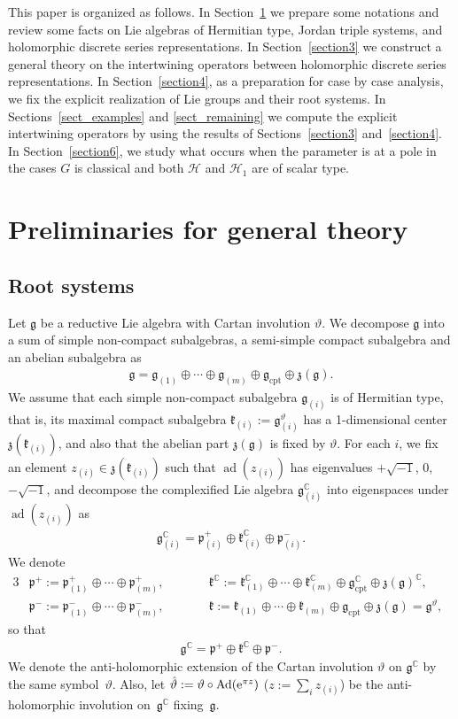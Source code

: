 \documentclass[pdftex]{sigma}
\numberwithin{equation}{section}
\newcommand{\BC}{\mathbb{C}}
\newcommand{\fg}{\mathfrak{g}}
\newcommand{\fk}{\mathfrak{k}}
\newcommand{\fp}{\mathfrak{p}}
\newcommand{\fz}{\mathfrak{z}}
\newcommand{\cH}{\mathcal{H}}
\begin{document}
This paper is organized as follows. In Section~\ref{section2} we prepare some notations and review some facts on Lie algebras of Hermitian type, Jordan triple systems, and holomorphic discrete series representations. In Section~\ref{section3} we construct a general theory on the intertwining operators between holomorphic discrete series representations. In Section~\ref{section4}, as a preparation for case by case analysis, we fix the explicit realization of Lie groups and their root systems. In Sections~\ref{sect_examples} and \ref{sect_remaining} we compute the explicit intertwining operators by using the results of Sections~\ref{section3} and~\ref{section4}. In Section~\ref{section6}, we study what occurs when the parameter is at a pole in the cases $G$ is classical and both $\cH$ and $\cH_1$ are of scalar type.

\section{Preliminaries for general theory}\label{section2}
\subsection{Root systems}\label{root_sys}
Let $\fg$ be a reductive Lie algebra with Cartan involution $\vartheta$. We decompose $\fg$ into a sum of simple non-compact subalgebras, a semi-simple compact subalgebra and an abelian subalgebra as
\begin{gather*} \fg=\fg_{(1)}\oplus\cdots\oplus\fg_{(m)}\oplus\fg_{\text{cpt}}\oplus\fz(\fg). \end{gather*}
We assume that each simple non-compact subalgebra $\fg_{(i)}$ is of Hermitian type, that is,
its maximal compact subalgebra $\fk_{(i)}:=\fg^\vartheta_{(i)}$ has a 1-dimensional center $\fz(\fk_{(i)})$, and also that the abelian part $\fz(\fg)$ is fixed by $\vartheta$. For each $i$, we fix an element $z_{(i)}\in\fz(\fk_{(i)})$ such that $\operatorname{ad}(z_{(i)})$ has eigenvalues $+\sqrt{-1}$, $0$, $-\sqrt{-1}$,
and decompose the complexified Lie algebra $\fg_{(i)}^\BC$ into eigenspaces under $\operatorname{ad}(z_{(i)})$ as
\begin{gather*} \fg_{(i)}^\BC=\fp^+_{(i)}\oplus \fk^\BC_{(i)}\oplus\fp^-_{(i)}. \end{gather*}
We denote
\begin{alignat*}{3}
& \fp^+ :=\fp^+_{(1)}\oplus\cdots\oplus\fp^+_{(m)},\qquad && \fk^\BC:=\fk_{(1)}^\BC\oplus\cdots\oplus\fk_{(m)}^\BC\oplus\fg_{\text{cpt}}^\BC\oplus\fz(\fg)^\BC,&\\
&\fp^-:=\fp^-_{(1)}\oplus\cdots\oplus\fp^-_{(m)},\qquad && \fk :=\fk_{(1)}\oplus\cdots\oplus\fk_{(m)}\oplus\fg_{\text{cpt}}\oplus\fz(\fg)=\fg^\vartheta,&
\end{alignat*}
so that
\begin{gather*} \fg^\BC=\fp^+\oplus\fk^\BC\oplus\fp^-. \end{gather*}
We denote the anti-holomorphic extension of the Cartan involution $\vartheta$ on $\fg^\BC$ by the same sym\-bol~$\vartheta$.
Also, let $\hat{\vartheta}:=\vartheta\circ \operatorname{Ad}({\rm e}^{\pi z})$ ($z:=\sum_i{z_{(i)}}$) be the anti-holomorphic involution on~$\fg^\BC$ fixing~$\fg$.
\end{document}
